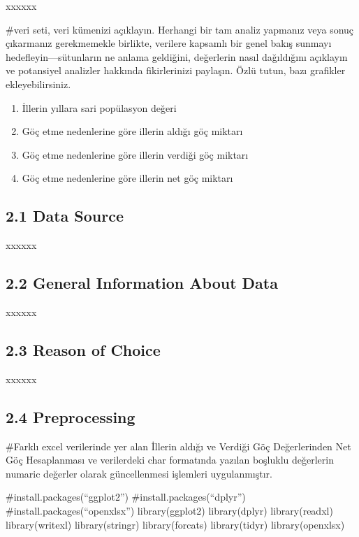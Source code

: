\documentclass[
  11pt,
  a4paper,
  DIV=11,
  numbers=noendperiod]{scrartcl}
\providecommand{\tightlist}{%
  \setlength{\itemsep}{0pt}\setlength{\parskip}{0pt}}
\begin{document}
xxxxxx

\#veri seti, veri kümenizi açıklayın. Herhangi bir tam analiz yapmanız
veya sonuç çıkarmanız gerekmemekle birlikte, verilere kapsamlı bir genel
bakış sunmayı hedefleyin---sütunların ne anlama geldiğini, değerlerin
nasıl dağıldığını açıklayın ve potansiyel analizler hakkında
fikirlerinizi paylaşın. Özlü tutun, bazı grafikler ekleyebilirsiniz.

\begin{enumerate}
\def\labelenumi{\arabic{enumi}.}
\tightlist
\item
  İllerin yıllara sari popülasyon değeri
\item
  Göç etme nedenlerine göre illerin aldığı göç miktarı
\item
  Göç etme nedenlerine göre illerin verdiği göç miktarı
\item
  Göç etme nedenlerine göre illerin net göç miktarı
\end{enumerate}

\subsection{2.1 Data Source}\label{data-source}

xxxxxx

\subsection{2.2 General Information About
Data}\label{general-information-about-data}

xxxxxx

\subsection{2.3 Reason of Choice}\label{reason-of-choice}

xxxxxx

\subsection{2.4 Preprocessing}\label{preprocessing}

\#Farklı excel verilerinde yer alan İllerin aldığı ve Verdiği Göç
Değerlerinden Net Göç Hesaplanması ve verilerdeki char formatında
yazılan boşluklu değerlerin numaric değerler olarak güncellenmesi
işlemleri uygulanmıştır.

\#install.packages(``ggplot2'') \#install.packages(``dplyr'')\\
\#install.packages(``openxlsx'') library(ggplot2) library(dplyr)
library(readxl) library(writexl) library(stringr) library(forcats)
library(tidyr) library(openxlsx)
\end{document}

